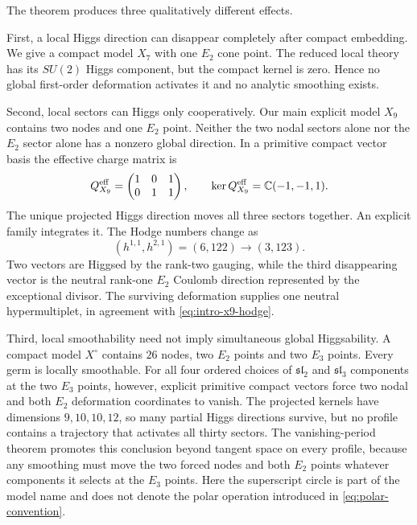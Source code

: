The theorem produces three qualitatively different effects.

First, a local Higgs direction can disappear completely after compact
embedding. We give a compact model $X_7$ with one $E_2$ cone point. The
reduced local theory has its $SU(2)$ Higgs component, but the compact kernel
is zero. Hence no global first-order deformation activates it and no analytic
smoothing exists.

Second, local sectors can Higgs only cooperatively. Our main explicit model $X_9$
contains two nodes and one $E_2$ point. Neither the two nodal sectors alone nor
the $E_2$ sector alone has a nonzero global direction. In a primitive compact
vector basis the effective charge matrix is
\begin{equation}
 Q_{X_9}^{\mathrm{eff}}=
 \begin{pmatrix}1&0&1\\0&1&1\end{pmatrix},
 \qquad
 \ker Q_{X_9}^{\mathrm{eff}}=\mathbb C(-1,-1,1).
 \label{eq:intro-x9}
\end{equation}
The unique projected Higgs direction moves all three sectors together. An
explicit family integrates it. The Hodge numbers change as
\begin{equation}
 (h^{1,1},h^{2,1})=(6,122)\longrightarrow(3,123).
 \label{eq:intro-x9-hodge}
\end{equation}
Two vectors are Higgsed by the rank-two gauging, while the third disappearing
vector is the neutral rank-one $E_2$ Coulomb direction represented by the
exceptional divisor. The surviving deformation supplies one neutral
hypermultiplet, in agreement with \eqref{eq:intro-x9-hodge}.

Third, local smoothability need not imply simultaneous global Higgsability. A
compact model $X^{\circ}$ contains $26$ nodes, two $E_2$ points and two $E_3$
points. Every germ is locally smoothable. For all four ordered choices of
$\mathfrak{sl}_2$ and $\mathfrak{sl}_3$ components at the two $E_3$ points,
however, explicit primitive compact vectors force two nodal and
both $E_2$ deformation coordinates to vanish. The projected kernels have
dimensions $9,10,10,12$, so many partial Higgs directions survive, but no
profile contains a trajectory that activates all thirty sectors. The
vanishing-period theorem promotes this conclusion beyond tangent space on
every profile, because any smoothing must move the two forced nodes and both
$E_2$ points whatever components it selects at the $E_3$ points.
Here the superscript circle is part of the model name and does not denote the
polar operation introduced in \eqref{eq:polar-convention}.

